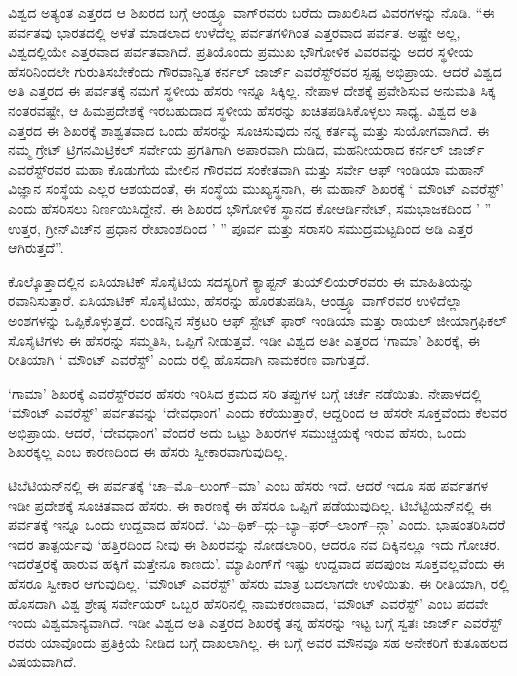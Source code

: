 ವಿಶ್ವದ ಅತ್ಯಂತ ಎತ್ತರದ ಆ ಶಿಖರದ ಬಗ್ಗೆ ಆಂಡ್ರ್ಯೂ ವಾಗ್​ರವರು ಬರೆದು ದಾಖಲಿಸಿದ ವಿವರಗಳನ್ನು ನೊಡಿ. “ಈ ಪರ್ವತವು ಭಾರತದಲ್ಲಿ ಅಳತೆ ಮಾಡಲಾದ ಉಳೆದೆಲ್ಲ ಪರ್ವತಗಳಿಗಿಂತ ಎತ್ತರವಾದ ಪರ್ವತ. ಅಷ್ಟೇ ಅಲ್ಲ, ವಿಶ್ವದಲ್ಲಿಯೇ ಎತ್ತರವಾದ ಪರ್ವತವಾಗಿದೆ. ಪ್ರತಿಯೊಂದು ಪ್ರಮುಖ ಭೌಗೋಳಿಕ ವಿವರವನ್ನು ಅದರ ಸ್ಥಳೀಯ ಹೆಸರಿನಿಂದಲೇ ಗುರುತಿಸಬೇಕೆಂದು ಗೌರವಾನ್ವಿತ ಕರ್ನಲ್​ ಜಾರ್ಜ್ ಎವರೆಸ್ಟ್​ರವರ ಸ್ಪಷ್ಟ ಅಭಿಪ್ರಾಯ. ಆದರೆ ವಿಶ್ವದ ಅತಿ ಎತ್ತರದ ಈ ಪರ್ವತಕ್ಕೆ ನಮಗೆ ಸ್ಥಳೀಯ ಹೆಸರು ಇನ್ನೂ ಸಿಕ್ಕಿಲ್ಲ. ನೇಪಾಳ ದೇಶಕ್ಕೆ ಪ್ರವೇಶಿಸುವ ಅನುಮತಿ ಸಿಕ್ಕ ನಂತರವಷ್ಟೇ, ಆ ಹಿಮಪ್ರದೇಶಕ್ಕೆ ಇರಬಹುದಾದ ಸ್ಥಳೀಯ ಹೆಸರನ್ನು ಖಚಿತಪಡಿಸಿಕೊಳ್ಳಲು ಸಾಧ್ಯ. ವಿಶ್ವದ ಅತಿ ಎತ್ತರದ ಈ ಶಿಖರಕ್ಕೆ ಶಾಶ್ವತವಾದ ಒಂದು ಹೆಸರನ್ನು ಸೂಚಿಸುವುದು ನನ್ನ ಕರ್ತವ್ಯ ಮತ್ತು ಸುಯೋಗವಾಗಿದೆ. ಈ ನಮ್ಮ ಗ್ರೇಟ್​ ಟ್ರಿಗನಮಿಟ್ರಿಕಲ್​ ಸರ್ವೇಯ ಪ್ರಗತಿಗಾಗಿ ಅಪಾರವಾಗಿ ದುಡಿದ, ಮಹನೀಯರಾದ ಕರ್ನಲ್​ ಜಾರ್ಜ್ ಎವರೆಸ್ಟ್​ರವರ ಮಹಾ ಕೊಡುಗೆಯ ಮೇಲಿನ ಗೌರವದ ಸಂಕೇತವಾಗಿ ಮತ್ತು ಸರ್ವೇ ಆಫ್​ ಇಂಡಿಯಾ ಮಹಾನ್​ ವಿಜ್ಞಾನ ಸಂಸ್ಥೆಯ ಎಲ್ಲರ ಆಶಯದಂತೆ, ಈ ಸಂಸ್ಥೆಯ ಮುಖ್ಯಸ್ಥನಾಗಿ, ಈ ಮಹಾನ್​ ಶಿಖರಕ್ಕೆ ‘ ಮೌಂಟ್​ ಎವರೆಸ್ಟ್​’ ಎಂದು ಹೆಸರಿಸಲು ನಿರ್ಣಯಿಸಿದ್ದೇನೆ. ಈ ಶಿಖರದ ಭೌಗೋಳಿಕ ಸ್ಥಾನದ ಕೋಆರ್ಡಿನೇಟ್​, ಸಮಭಾಜಕದಿಂದ ’ ” ಉತ್ತರ, ಗ್ರೀನ್​ವಿಚ್​ನ ಪ್ರಧಾನ ರೇಖಾಂಶದಿಂದ ’ ” ಪೂರ್ವ ಮತ್ತು ಸರಾಸರಿ ಸಮುದ್ರಮಟ್ಟದಿಂದ  ಅಡಿ ಎತ್ತರ ಆಗಿರುತ್ತದೆ”.

ಕೊಲ್ಕೊತ್ತಾದಲ್ಲಿನ ಏಸಿಯಾಟಿಕ್​ ಸೊಸೈಟಿಯ ಸದಸ್ಯರಿಗೆ ಕ್ಯಾಪ್ಟನ್​ ತುಯ್​ಲಿಯರ್​ರವರು ಈ ಮಾಹಿತಿಯನ್ನು ರವಾನಿಸುತ್ತಾರೆ. ಏಸಿಯಾಟಿಕ್​ ಸೊಸೈಟಿಯು, ಹೆಸರನ್ನು ಹೊರತುಪಡಿಸಿ, ಆಂಡ್ರ್ಯೂ ವಾಗ್​ರವರ ಉಳಿದೆಲ್ಲಾ ಅಂಶಗಳನ್ನು ಒಪ್ಪಿಕೊಳ್ಳುತ್ತದೆ. ಲಂಡನ್ನಿನ ಸೆಕ್ರಟರಿ ಆಫ್​ ಸ್ಟೇಟ್​ ಫಾರ್​ ಇಂಡಿಯಾ ಮತ್ತು ರಾಯಲ್​ ಜೀಯಾಗ್ರಫಿಕಲ್​ ಸೊಸೈಟಿಗಳು ಈ ಹೆಸರನ್ನು ಸಮ್ಮತಿಸಿ, ಒಪ್ಪಿಗೆ ನೀಡುತ್ತವೆ. ಇಡೀ ವಿಶ್ವದ ಅತೀ ಎತ್ತರದ ‘ಗಾಮಾ’ ಶಿಖರಕ್ಕೆ, ಈ ರೀತಿಯಾಗಿ ‘ ಮೌಂಟ್​ ಎವರೆಸ್ಟ್​’ ಎಂದು  ರಲ್ಲಿ ಹೊಸದಾಗಿ ನಾಮಕರಣ ವಾಗುತ್ತದೆ.

‘ಗಾಮಾ’ ಶಿಖರಕ್ಕೆ ಎವರೆಸ್ಟ್​ರವರ ಹೆಸರು ಇರಿಸಿದ ಕ್ರಮದ ಸರಿ ತಪ್ಪುಗಳ ಬಗ್ಗೆ ಚರ್ಚೆ ನಡೆಯಿತು. ನೇಪಾಳದಲ್ಲಿ `ಮೌಂಟ್​ ಎವರೆಸ್ಟ್​’ ಪರ್ವತವನ್ನು ‘ದೇವಧಾಂಗ’ ಎಂದು ಕರೆಯುತ್ತಾರೆ, ಆದ್ದರಿಂದ ಆ ಹೆಸರೇ ಸೂಕ್ತವೆಂದು ಕೆಲವರ ಅಭಿಪ್ರಾಯ. ಆದರೆ, ‘ದೇವಧಾಂಗ’ ವೆಂದರೆ ಅದು ಒಟ್ಟು ಶಿಖರಗಳ ಸಮುಚ್ಚಯಕ್ಕೆ ಇರುವ ಹೆಸರು, ಒಂದು ಶಿಖರಕ್ಕಲ್ಲ ಎಂಬ ಕಾರಣದಿಂದ ಈ ಹೆಸರು ಸ್ವೀಕಾರವಾಗುವುದಿಲ್ಲ.

ಟಿಬೆಟಿಯನ್​ನಲ್ಲಿ ಈ ಪರ್ವತಕ್ಕೆ ‘ಚಾ–ಮೊ–ಲುಂಗ್​–ಮಾ’ ಎಂಬ ಹೆಸರು ಇದೆ. ಆದರೆ ಇದೂ ಸಹ ಪರ್ವತಗಳ ಇಡೀ ಪ್ರದೇಶಕ್ಕೆ ಸೂಚಿತವಾದ ಹೆಸರು. ಈ ಕಾರಣಕ್ಕೆ ಈ ಹೆಸರೂ ಒಪ್ಪಿಗೆ ಪಡೆಯುವುದಿಲ್ಲ. ಟಿಬೆಟ್ಟಿಯನ್​ನಲ್ಲಿ ಈ ಪರ್ವತಕ್ಕೆ ಇನ್ನೂ ಒಂದು ಉದ್ದವಾದ ಹೆಸರಿದೆ. ‘ಮಿ–ಥಿಕ್​–ದ್ಗು–ಬ್ಯಾ–ಫರ್​–ಲಾಂಗ್​–ನ್ಗಾ’ ಎಂದು. ಭಾಷಂತರಿಸಿದರೆ ಇದರ ತಾತ್ಪರ್ಯವು ‘ಹತ್ತಿರದಿಂದ ನೀವು ಈ ಶಿಖರವನ್ನು ನೋಡಲಾರಿರಿ, ಆದರೂ ನವ ದಿಕ್ಕಿನಲ್ಲೂ ಇದು ಗೋಚರ. ಇದರೆತ್ತರಕ್ಕೆ ಹಾರುವ ಹಕ್ಕಿಗೆ ಮತ್ತೇನೂ ಕಾಣದು’. ಮ್ಯಾಪಿಂಗ್​ಗೆ ಇಷ್ಟು ಉದ್ದವಾದ ಪದಪುಂಜ ಸೂಕ್ತವಲ್ಲವೆಂದು ಈ ಹೆಸರೂ ಸ್ವೀಕಾರ ಆಗುವುದಿಲ್ಲ. ‘ಮೌಂಟ್​​ ಎವರೆಸ್ಟ್​’ ಹೆಸರು ಮಾತ್ರ ಬದಲಾಗದೇ ಉಳಿಯಿತು. ಈ ರೀತಿಯಾಗಿ,  ರಲ್ಲಿ ಹೊಸದಾಗಿ ವಿಶ್ವ ಶ್ರೇಷ್ಠ ಸರ್ವೇಯರ್​ ಒಬ್ಬರ ಹೆಸರಿನಲ್ಲಿ ನಾಮಕರಣವಾದ, `ಮೌಂಟ್​ ಎವರೆಸ್ಟ್​’ ಎಂಬ ಪದವೇ ಇಂದು ವಿಶ್ವಮಾನ್ಯವಾಗಿದೆ. ಇಡೀ ವಿಶ್ವದ ಅತಿ ಎತ್ತರದ ಶಿಖರಕ್ಕೆ ತನ್ನ ಹೆಸರನ್ನು ಇಟ್ಟ ಬಗ್ಗೆ ಸ್ವತಃ ಜಾರ್ಜ್ ಎವರೆಸ್ಟ್​ರವರು ಯಾವೊಂದು ಪ್ರತಿಕ್ರಿಯೆ ನೀಡಿದ ಬಗ್ಗೆ ದಾಖಲಾಗಿಲ್ಲ. ಈ ಬಗ್ಗೆ ಅವರ ಮೌನವೂ ಸಹ ಅನೇಕರಿಗೆ ಕುತೂಹಲದ ವಿಷಯವಾಗಿದೆ.

